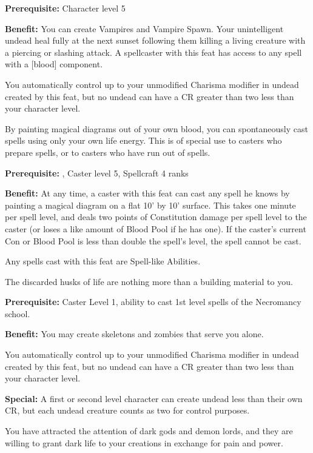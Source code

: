 \textbf{Prerequisite:} Character level 5

\textbf{Benefit:} You can create Vampires and Vampire Spawn. Your unintelligent undead heal fully at the next sunset following them killing a living creature with a piercing or slashing attack. A spellcaster with this feat has access to any spell with a [blood] component.

You automatically control up to your unmodified Charisma modifier in undead created by this feat, but no undead can have a CR greater than two less than your character level.


By painting magical diagrams out of your own blood, you can spontaneously cast spells using only your own life energy. This is of special use to casters who prepare spells, or to casters who have run out of spells.

\textbf{Prerequisite:} , Caster level 5, Spellcraft 4 ranks

\textbf{Benefit:} At any time, a caster with this feat can cast any spell he knows by painting a magical diagram on a flat 10' by 10' surface. This takes one minute per spell level, and deals two points of Constitution damage per spell level to the caster (or loses a like amount of Blood Pool if he has one). If the caster's current Con or Blood Pool is less than double the spell's level, the spell cannot be cast.

Any spells cast with this feat are Spell-like Abilities.


The discarded husks of life are nothing more than a building material to you.

\textbf{Prerequisite:} Caster Level 1, ability to cast 1st level spells of the Necromancy school.

\textbf{Benefit:} You may create skeletons and zombies that serve you alone.

You automatically control up to your unmodified Charisma modifier in undead created by this feat, but no undead can have a CR greater than two less than your character level.

\textbf{Special:} A first or second level character can create undead less than their own CR, but each undead creature counts as two for control purposes.


You have attracted the attention of dark gods and demon lords, and they are willing to grant dark life to your creations in exchange for pain and power.

